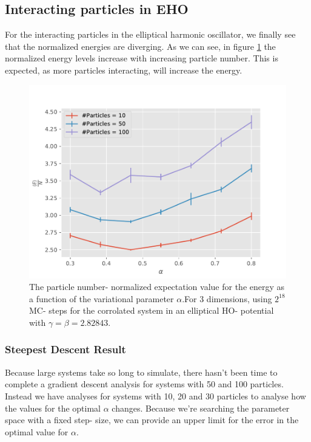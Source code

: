 \documentclass[11pt,a4paper,titlepage]{article}
\begin{document}
\subsection{Interacting particles in EHO}
For the interacting particles in the elliptical harmonic oscillator, we finally see that the normalized energies are diverging. As we can see, in figure \ref{interactElliptcEnergy} the normalized energy levels increase with increasing particle number. This is expected, as more particles interacting, will increase the energy.
\begin{figure}[H]
\centering

\includegraphics[trim=0cm 0.0cm 0cm 1.0cm, clip=true,scale = 0.7]{EllipticOscillator_CorrelatedGaussian_2pow18_NoTitle.pdf}
\caption[Interacting, EHO potential]{The particle number- normalized expectation value for the energy as a function of the variational parameter $\alpha$.For 3 dimensions, using $2^{18}$ MC- steps for the corrolated system in an elliptical HO- potential with $\gamma = \beta = 2.82843$.}\label{interactElliptcEnergy}
\end{figure}

\subsubsection{Steepest Descent Result}
Because large systems take so long to simulate, there hasn't been time to complete a gradient descent analysis for systems with 50 and 100 particles. Instead we have analyses for systems with 10, 20 and 30 particles to analyse how the values for the optimal $\alpha$ changes. Because we're searching the parameter space with a fixed step- size, we can provide an upper limit for the error in the optimal value for  $\alpha$.
\end{document}
